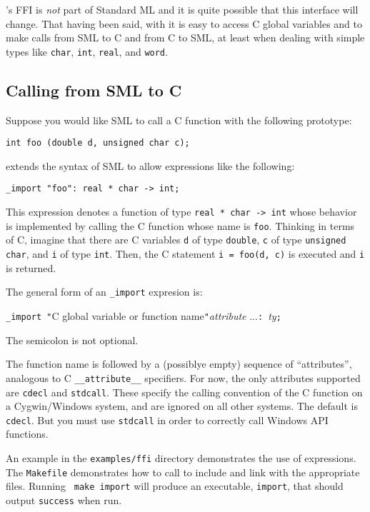 
{\mlton}'s FFI is {\em not} part of Standard ML and it is quite
possible that this interface will change.  That having been said, with
{\mlton} it is easy to access C global variables and to make calls
from SML to C and from C to SML, at least when dealing with simple
types like {\tt char}, {\tt int}, {\tt real}, and {\tt word}.

\subsection{Calling from SML to C}
Suppose you would like SML to call a C function with the following
prototype:
\begin{verbatim}
int foo (double d, unsigned char c);
\end{verbatim}
{\mlton} extends the syntax of SML to allow expressions like the following:
\begin{verbatim}
_import "foo": real * char -> int;
\end{verbatim}
This expression denotes a function of type {\tt real * char -> int}
whose behavior is implemented by calling the C function whose name is
{\tt foo}.  Thinking in terms of C, imagine that there are C
variables {\tt d} of type {\tt double}, {\tt c} of type {\tt unsigned
char}, and {\tt i} of type {\tt int}.  Then, the C statement
\mbox{\tt i = foo(d, c)} is executed and {\tt i} is returned.

The general form of an \verb+_import+ expresion is:
\begin{center}
{\tt \_import "}C global variable or function name{\tt "}{\it attribute}
...{\tt : }{\it ty}{\tt ;}
\end{center}
The semicolon is not optional.

The function name is followed by a (possiblye empty) sequence of
``attributes'', analogous to C {\tt\_\_attribute\_\_} specifiers.  For
now, the only attributes supported are {\tt cdecl} and {\tt stdcall}.
These specify the calling convention of the C function on a
Cygwin/Windows system, and are ignored on all other systems.  The
default is {\tt cdecl}.  But you must use {\tt stdcall} in order to
correctly call Windows API functions.

An example in the {\tt examples/ffi} directory demonstrates the use of
{\ffi} expressions.  The {\tt Makefile} demonstrates how to call
{\mlton} to include and link with the appropriate files.  Running {\tt
make import} will produce an executable, {\tt import}, that should
output {\tt success} when run.

